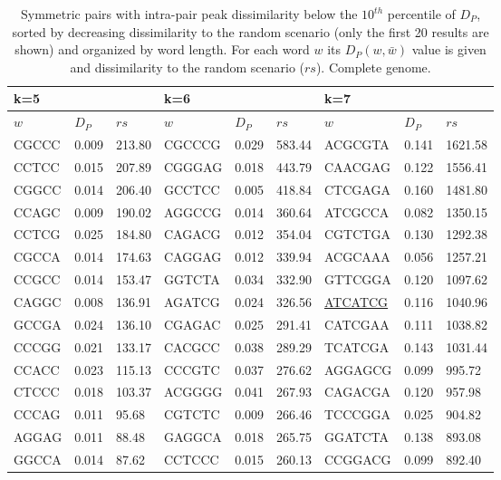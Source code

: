 \documentclass[review,12pt]{elsarticle}
\begin{document}
\begin{table}[htbp]
\centering
\caption{Symmetric pairs with intra-pair peak
  dissimilarity below the $10^{th}$ percentile
	of $D_P$, sorted by decreasing dissimilarity
	to the random scenario (only the first 20
	results are shown)
	and organized by word length.
	For each word $w$ its $D_P(w,\bar{w})$ value
	is given and dissimilarity
	to the random scenario ($rs$). Complete genome.}
\renewcommand{\arraystretch}{1.2}
\setlength\tabcolsep{2pt}
\scriptsize
\begin{tabular}{|lll|lll|lll|}
\hline
    k=5 & & & k=6 & & & k=7 & & \\
\hline
    $w$    & $D_P$  & $rs$    & $w$    & $D_P$& $rs$    & $w$     & $D_P$ & $rs$ \\
    CGCCC  & 0.009   & 213.80 & CGCCCG & 0.029 & 583.44 & ACGCGTA & 0.141  & 1621.58\\
    CCTCC  & 0.015   & 207.89 & CGGGAG & 0.018 & 443.79 & CAACGAG & 0.122  & 1556.41\\
    CGGCC  & 0.014   & 206.40 & GCCTCC & 0.005 & 418.84 & CTCGAGA & 0.160  & 1481.80\\
    CCAGC  & 0.009   & 190.02 & AGGCCG & 0.014 & 360.64 & ATCGCCA & 0.082  & 1350.15\\
    CCTCG  & 0.025   & 184.80 & CAGACG & 0.012 & 354.04 & CGTCTGA & 0.130  & 1292.38\\
    CGCCA  & 0.014   & 174.63 & CAGGAG & 0.012 & 339.94 & ACGCAAA & 0.056  & 1257.21\\
    CCGCC  & 0.014   & 153.47 & GGTCTA & 0.034 & 332.90 & GTTCGGA & 0.120  & 1097.62\\
    CAGGC  & 0.008   & 136.91 & AGATCG & 0.024 & 326.56 & \underline{ATCATCG} & 0.116 & 1040.96\\ %
    GCCGA  & 0.024   & 136.10 & CGAGAC & 0.025 & 291.41 & CATCGAA & 0.111  & 1038.82\\
    CCCGG  & 0.021   & 133.17 & CACGCC & 0.038 & 289.29 & TCATCGA & 0.143  & 1031.44\\
    CCACC  & 0.023   & 115.13 & CCCGTC & 0.037 & 276.62 & AGGAGCG & 0.099  & 995.72\\
    CTCCC  & 0.018   & 103.37 & ACGGGG & 0.041 & 267.93 & CAGACGA & 0.120  & 957.98\\
    CCCAG  & 0.011   & 95.68  & CGTCTC & 0.009 & 266.46 & TCCCGGA & 0.025  & 904.82\\
    AGGAG  & 0.011   & 88.48  & GAGGCA & 0.018 & 265.75 & GGATCTA & 0.138  & 893.08\\
    GGCCA  & 0.014   & 87.62  & CCTCCC & 0.015 & 260.13 & CCGGACG & 0.099  & 892.40\\

\end{tabular}
\end{table}
\end{document}
